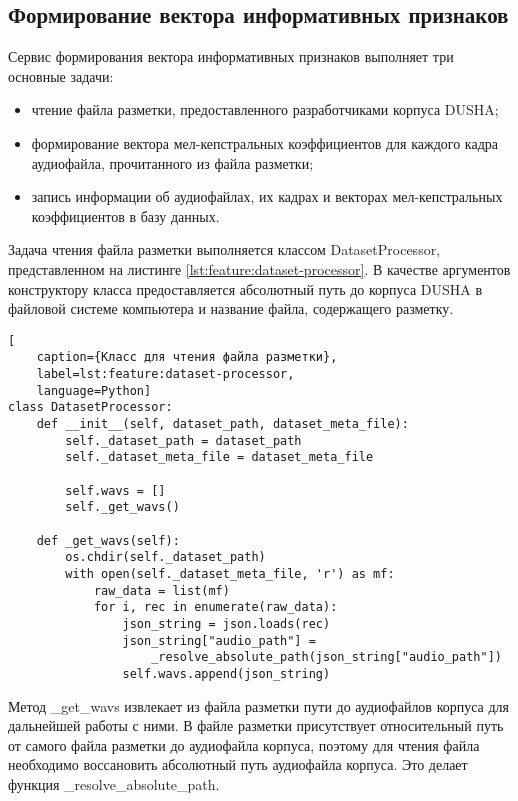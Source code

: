 \subsection{Формирование вектора информативных признаков}
Сервис формирования вектора информативных признаков выполняет три основные задачи:
\begin{itemize}
	\item чтение файла разметки, предоставленного разработчиками корпуса DUSHA;
	\item формирование вектора мел-кепстральных коэффициентов для каждого кадра аудиофайла, прочитанного из файла разметки;
	\item запись информации об аудиофайлах, их кадрах и векторах мел-кепстральных коэффициентов в базу данных.
\end{itemize}
Задача чтения файла разметки выполняется классом DatasetProcessor, представленном на листинге \ref{lst:feature:dataset-processor}. В качестве аргументов конструктору класса предоставляется абсолютный путь до корпуса DUSHA в файловой системе компьютера и название файла, содержащего разметку.
\begin{lstlisting}[
	caption={Класс для чтения файла разметки},
	label=lst:feature:dataset-processor,
	language=Python]
class DatasetProcessor:
    def __init__(self, dataset_path, dataset_meta_file):
        self._dataset_path = dataset_path
        self._dataset_meta_file = dataset_meta_file

        self.wavs = []
        self._get_wavs()

    def _get_wavs(self):
        os.chdir(self._dataset_path)
        with open(self._dataset_meta_file, 'r') as mf:
            raw_data = list(mf)
            for i, rec in enumerate(raw_data):
                json_string = json.loads(rec)
                json_string["audio_path"] =
                	_resolve_absolute_path(json_string["audio_path"])
                self.wavs.append(json_string)
\end{lstlisting}
Метод \_get\_wavs извлекает из файла разметки пути до аудиофайлов корпуса для дальнейшей работы с ними. В файле разметки присутствует относительный путь от самого файла разметки до аудиофайла корпуса, поэтому для чтения файла необходимо воссановить абсолютный путь аудиофайла корпуса. Это делает функция \_resolve\_absolute\_path.

